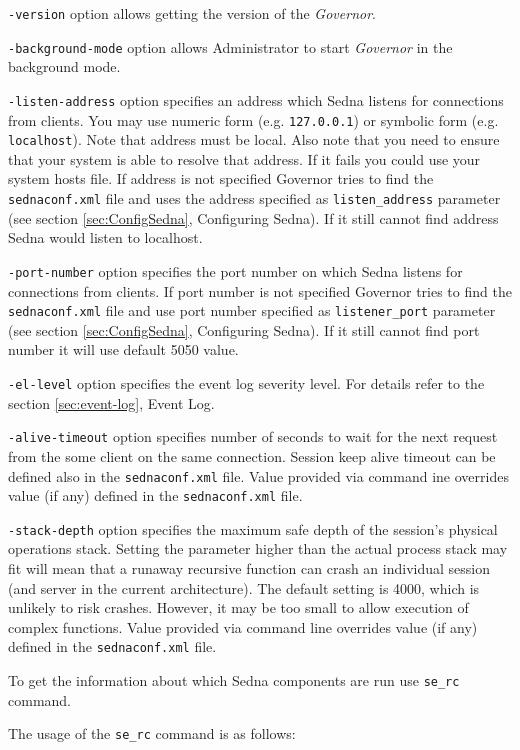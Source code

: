 \documentclass[a4paper,12pt]{article}
\begin{document}
\verb!-version! option allows getting the version of the \emph{Governor}.

\verb!-background-mode! option allows Administrator to start \emph{Governor} in
the background mode.

\verb!-listen-address! option specifies an address which Sedna listens for
connections from clients. You may use numeric form (e.g. \verb!127.0.0.1!) or
symbolic form (e.g. \verb!localhost!). Note that address must be local. Also note
that you need to ensure that your system is able to resolve that address. If it
fails you could use your system hosts file\cite{link:hosts}.
If address is not specified Governor tries to find the \verb!sednaconf.xml! file
and uses the address specified as \verb!listen_address! parameter (see section
\ref{sec:ConfigSedna}, Configuring Sedna). If it still cannot find address Sedna
would listen to localhost.

\verb!-port-number! option specifies the port number on which Sedna listens for
connections from clients. If port number is not specified Governor tries to find
the \verb!sednaconf.xml! file and use port number specified as
\verb!listener_port! parameter (see section \ref{sec:ConfigSedna}, Configuring
Sedna). If it still cannot find port number it will use default 5050 value.

\verb!-el-level! option specifies the event log severity level. For details
refer to the section \ref{sec:event-log}, Event Log.

\verb!-alive-timeout! option specifies number of seconds to wait for the next
request from the some client on the same connection. Session keep alive timeout
can be defined also in the \verb!sednaconf.xml! file. Value provided via command
ine overrides value (if any) defined in the \verb!sednaconf.xml! file.

\verb!-stack-depth! option specifies the maximum safe depth of the session's
physical operations stack. Setting the parameter higher than the actual process
stack may fit will mean that a runaway recursive function can crash an
individual session (and server in the current architecture). The default setting
is 4000, which is unlikely to risk crashes. However, it may be too small to
allow execution of complex functions. Value provided via command line overrides
value (if any) defined in the \verb!sednaconf.xml! file.

To get the information about which Sedna components are run use \verb!se_rc!
command.

The usage of the \verb!se_rc! command is as follows:
\end{document}
